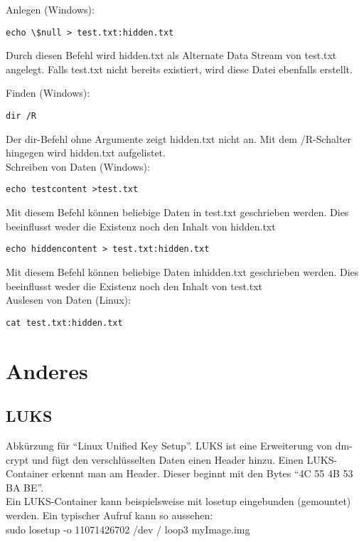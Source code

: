 Anlegen (Windows):\\

\begin{lstlisting}
echo \$null > test.txt:hidden.txt
\end{lstlisting}
Durch diesen Befehl wird hidden.txt als Alternate Data Stream von test.txt angelegt. Falls test.txt nicht bereits existiert, wird diese Datei ebenfalls erstellt.

Finden (Windows):\\

\begin{lstlisting}
dir /R
\end{lstlisting}
Der dir-Befehl ohne Argumente zeigt hidden.txt nicht an. Mit dem /R-Schalter hingegen wird hidden.txt aufgelistet.\\

Schreiben von Daten (Windows):\\

\begin{lstlisting}
echo testcontent >test.txt
\end{lstlisting}
Mit diesem Befehl können beliebige Daten in test.txt geschrieben werden. Dies beeinflusst weder die Existenz noch den Inhalt von hidden.txt\\

\begin{lstlisting}
echo hiddencontent > test.txt:hidden.txt
\end{lstlisting}
Mit diesem Befehl können beliebige Daten inhidden.txt geschrieben werden. Dies beeinflusst weder die Existenz noch den Inhalt von test.txt\\

Auslesen von Daten (Linux):\\
\begin{lstlisting}
cat test.txt:hidden.txt
\end{lstlisting}


\section{Anderes}
\subsection{LUKS}
Abkürzung für \enquote{Linux Unified Key Setup}. LUKS ist eine Erweiterung von dm-crypt und fügt den verschlüsselten Daten einen Header hinzu. Einen LUKS-Container erkennt man am Header. Dieser beginnt mit den Bytes \enquote{4C 55 4B 53 BA BE}.\\
Ein LUKS-Container kann beispielsweise mit losetup eingebunden (gemountet) werden. Ein typischer Aufruf kann so aussehen:\\
sudo losetup -o 11071426702 /dev / loop3 myImage.img\\

\clearpage
